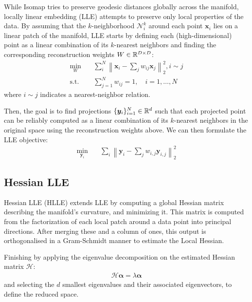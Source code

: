 \documentclass{article} %
\newcommand{\norm}[1]{\left\lVert#1\right\rVert}
\begin{document}
While Isomap tries to preserve geodesic distances globally across the manifold, locally linear embedding (LLE) \citep{lle} attempts to preserve only local properties of the data. By assuming that the $k$-neighborhood $\mathcal{N}_i^k$ around each point $\bm{x}_i$ lies on a linear patch of the manifold, LLE starts by defining each (high-dimensional) point as a linear combination of its $k$-nearest neighbors and finding the corresponding reconstruction weights $W\in\mathbb{R}^{D\times D}$:
\begin{align}
    \min_{W} \quad &\sum_i^N\norm{\bm{x}_i-\sum_{j}w_{ij}\bm{x}_j}_2^2,i\sim j\\
    \text{s.t.} \quad & \sum_{j=1}^N w_{ij} = 1,\quad i=1,\dotsc,N
\end{align}
where $i\sim j$ indicates a nearest-neighbor relation.

Then, the goal is to find projections $\{\bm{y}_{i}\}_{i=1}^{N}\in\mathbb{R}^d$ such that each projected point can be reliably computed as a linear combination of its $k$-nearest neighbors in the original space using the reconstruction weights above. We can then formulate the LLE objective:
\begin{align}
    \min_{\bm{y}_{i}} \quad & \sum_{i}\norm{\bm{y}_{i} - \sum_{j}w_{i,j}\bm{y}_{i,j}}_{2}^{2}
\end{align}

\subsection{Hessian LLE}

Hessian LLE (HLLE) \citep{hlle} extends LLE by computing a global Hessian matrix describing the manifold's curvature, and minimizing it. This matrix is computed from the factorization of each local patch around a data point into principal directions. After merging these and a column of ones, this output is orthogonalised in a Gram-Schmidt manner to estimate the Local Hessian.

Finishing by applying the eigenvalue decomposition on the estimated Hessian matrix $\mathcal{H}$:
\begin{align}
    \mathcal{H} \bm{\alpha} = \lambda \bm{\alpha}
\end{align}
and selecting the $d$ smallest eigenvalues and their associated eigenvectors, to define the reduced space. 


\end{document}
